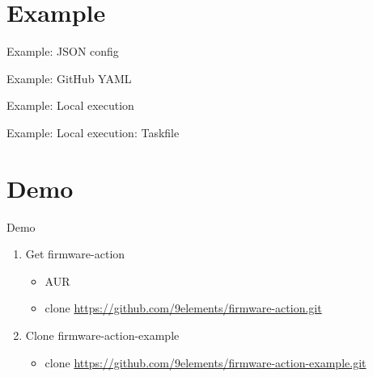 \documentclass{beamer}
\begin{document}


\section{Example}

\begin{frame}{Example: JSON config}

\end{frame}

\begin{frame}{Example: GitHub YAML}

\end{frame}

\begin{frame}{Example: Local execution}

\end{frame}

\begin{frame}{Example: Local execution: Taskfile}

\end{frame}



\section{Demo}
\begin{frame}{Demo}
	\begin{enumerate}
	\item{Get firmware-action}
		\begin{itemize}
		\item{AUR}
		\item{clone \url{https://github.com/9elements/firmware-action.git}}
		\end{itemize}
	\item{Clone firmware-action-example}
		\begin{itemize}
		\item{clone \url{https://github.com/9elements/firmware-action-example.git}}
		\end{itemize}
	\end{enumerate}
\end{frame}
\end{document}
